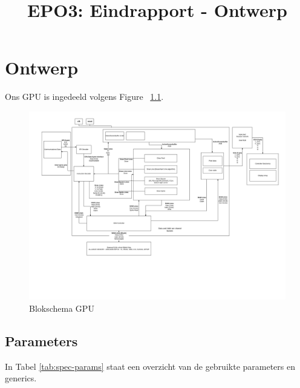 \documentclass{scrartcl} %
\author{}
\title{EPO3: Eindrapport - Ontwerp}
\begin{document}
\chapter{Ontwerp}
\label{ch:ontwerp}

Ons GPU is ingedeeld volgens Figure ~\ref{fig:Blokschema GPU}.

\begin{figure}[H]
\centering
	\includegraphics[width=\linewidth, angle=90]{resource/systeemdrawing-v2.png}
	\caption{Blokschema GPU}
	\label{fig:Blokschema GPU}
\end{figure}

\section{Parameters}
In Tabel \ref{tab:spec-params} staat een overzicht van de gebruikte parameters en generics.
\end{document}
